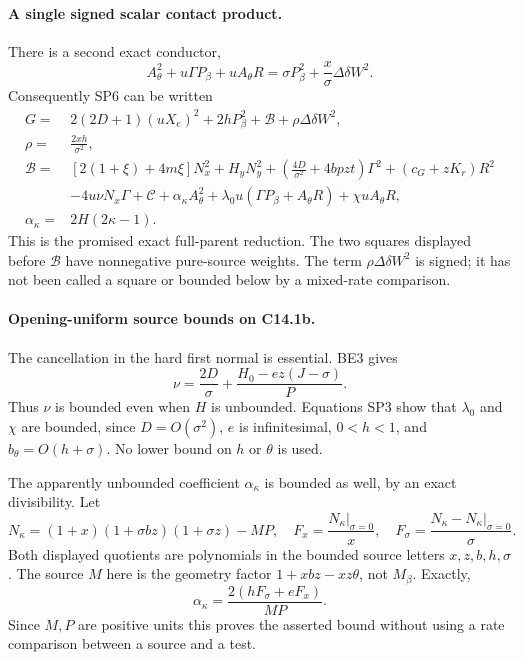 \paragraph{A single signed scalar contact product.}
There is a second exact conductor,
\[
 A_\theta^2+u\Gamma P_\beta+uA_\theta R
 =\sigma P_\beta^2+
       \frac{x}{\sigma}\Delta\delta W^2.
 \tag{SP7}
\]
Consequently SP6 can be written
\begin{align*}
 G={}&2(2D+1)(uX_e)^2+2hP_\beta^2+\mathscr B
               +\rho\Delta\delta W^2,\\
 \rho={}&\frac{2xh}{\sigma^2},\\
 \mathscr B={}&[2(1+\xi)+4m\xi]N_x^2+H_yN_y^2
 +\left(\frac{4D}{\sigma^2}+4bpzt\right)\Gamma^2
 +(c_G+zK_r)R^2\\
 &-4u\nu N_x\Gamma+\mathscr C+\alpha_\kappa A_\theta^2
 +\lambda_0u(\Gamma P_\beta+A_\theta R)+\chi uA_\theta R,\\
 \alpha_\kappa={}&2H(2\kappa-1).
 \tag{SP8}
\end{align*}
This is the promised exact full-parent reduction. The two squares
displayed before $\mathscr B$ have nonnegative pure-source weights.
The term $\rho\Delta\delta W^2$ is signed; it has not been called a
square or bounded below by a mixed-rate comparison.

\paragraph{Opening-uniform source bounds on C14.1b.}
The cancellation in the hard first normal is essential. BE3 gives
\[
 \nu=\frac{2D}{\sigma}
       +\frac{H_0-ez(J-\sigma)}{P}.
 \tag{SP9}
\]
Thus $\nu$ is bounded even when $H$ is unbounded. Equations SP3 show
that $\lambda_0$ and $\chi$ are bounded, since $D=O(\sigma^2)$,
$e$ is infinitesimal, $0<h<1$, and $b_\theta=O(h+\sigma)$.
No lower bound on $h$ or $\theta$ is used.

The apparently unbounded coefficient $\alpha_\kappa$ is bounded as
well, by an exact divisibility. Let
\[
 N_\kappa=(1+x)(1+\sigma bz)(1+\sigma z)-MP,
 \quad F_x=\frac{N_\kappa|_{\sigma=0}}x,
 \quad F_\sigma=\frac{N_\kappa-N_\kappa|_{\sigma=0}}\sigma.
\]
Both displayed quotients are polynomials in the bounded source
letters $x,z,b,h,\sigma$. The source $M$ here is the geometry factor
$1+xbz-xz\theta$, not $M_\beta$. Exactly,
\[
 \alpha_\kappa=\frac{2(hF_\sigma+eF_x)}{MP}.
 \tag{SP10}
\]
Since $M,P$ are positive units this proves the asserted bound without
using a rate comparison between a source and a test.

